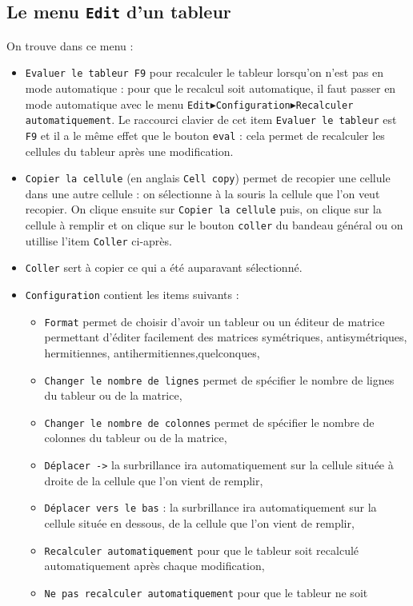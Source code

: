 \documentclass[a4paper,11pt]{book}
\begin{document}
\subsection{Le menu {\tt Edit} d'un tableur}
On trouve dans ce menu :
\begin{itemize}
\item {\tt Evaluer le tableur F9} pour recalculer le tableur lorsqu'on n'est 
pas en mode automatique : pour que le recalcul soit automatique, il faut passer
en  mode automatique avec le menu {\tt Edit$\blacktriangleright$Configuration$\blacktriangleright$Recalculer automatiquement}. Le raccourci clavier de cet item
{\tt Evaluer le tableur} est {\tt F9} et il a le m\^eme effet que le bouton 
{\tt eval} : cela permet 
de  recalculer les cellules du tableur apr\`es une modification.
\item {\tt Copier la cellule} (en anglais {\tt Cell copy}) permet de recopier 
une cellule dans une autre cellule : on s\'electionne \`a la souris la cellule 
que l'on veut recopier. On clique ensuite sur {\tt Copier la cellule} puis, on 
clique sur la cellule \`a remplir et on clique sur le bouton {\tt coller} du 
bandeau g\'en\'eral ou on utillise l'item {\tt Coller} ci-apr\`es.
\item {\tt Coller} sert \`a copier ce qui a \'et\'e auparavant s\'electionn\'e.
\item {\tt Configuration} contient les items suivants :
\begin{itemize}
\item {\tt Format} permet de choisir d'avoir un tableur ou un \'editeur de 
matrice permettant d'\'editer facilement des matrices sym\'etriques, 
antisym\'etriques, hermitiennes, antihermitiennes,quelconques,
\item {\tt Changer le nombre de lignes} permet de sp\'ecifier le nombre
de lignes du tableur ou de la matrice,
\item {\tt Changer le nombre de colonnes} permet de sp\'ecifier le nombre
de colonnes du tableur ou de la matrice,
\item  {\tt D\'eplacer ->}  la surbrillance ira automatiquement sur la cellule 
situ\'ee \`a droite de la cellule que l'on vient de remplir,
\item {\tt D\'eplacer vers le bas} : la surbrillance ira automatiquement sur la
cellule situ\'ee en dessous, de la  cellule que l'on vient de remplir,
\item {\tt Recalculer automatiquement} pour que le tableur soit recalcul\'e
automatiquement apr\`es chaque modification,
\item {\tt Ne pas recalculer automatiquement} pour que le tableur ne soit 

\end{itemize}
\end{itemize}
\end{document}
